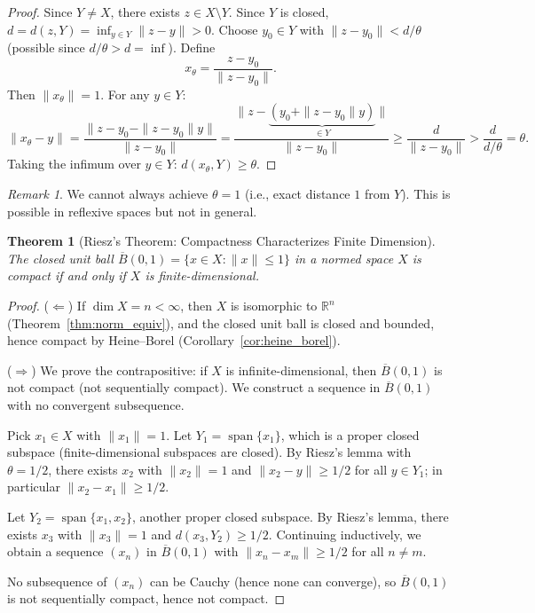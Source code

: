 \documentclass[11pt,a4paper]{article}
\theoremstyle{definition}
\theoremstyle{plain}
\newtheorem{theorem}{Theorem}[section]
\theoremstyle{remark}
\newtheorem{remark}{Remark}[section]
\newcommand{\R}{\mathbb{R}}
\DeclareMathOperator{\Span}{span}
\begin{document}
\begin{proof}
Since $Y \ne X$, there exists $z \in X \setminus Y$. Since $Y$ is closed,
$d = d(z, Y) = \inf_{y \in Y} \|z - y\| > 0$. Choose $y_0 \in Y$ with
$\|z - y_0\| < d/\theta$ (possible since $d/\theta > d = \inf$). Define
\[
x_\theta = \frac{z - y_0}{\|z - y_0\|}.
\]
Then $\|x_\theta\| = 1$. For any $y \in Y$:
\[
\|x_\theta - y\| = \frac{\|z - y_0 - \|z - y_0\| y\|}{\|z - y_0\|}
= \frac{\|z - \underbrace{(y_0 + \|z - y_0\| y)}_{\in Y}\|}{\|z - y_0\|}
\ge \frac{d}{\|z - y_0\|} > \frac{d}{d/\theta} = \theta.
\]
Taking the infimum over $y \in Y$: $d(x_\theta, Y) \ge \theta$.
\end{proof}

\begin{remark}
We cannot always achieve $\theta = 1$ (i.e., exact distance $1$ from $Y$). This is
possible in reflexive spaces but not in general.
\end{remark}

\begin{theorem}[Riesz's Theorem: Compactness Characterizes Finite Dimension]
\label{thm:riesz_compact}
The closed unit ball $\overline{B}(0,1) = \{x \in X : \|x\| \le 1\}$ in a normed
space $X$ is compact if and only if $X$ is finite-dimensional.
\end{theorem}

\begin{proof}
($\Leftarrow$) If $\dim X = n < \infty$, then $X$ is isomorphic to $\R^n$
(Theorem~\ref{thm:norm_equiv}), and the closed unit ball is closed and bounded,
hence compact by Heine--Borel (Corollary~\ref{cor:heine_borel}).

($\Rightarrow$) We prove the contrapositive: if $X$ is infinite-dimensional, then
$\overline{B}(0,1)$ is not compact (not sequentially compact). We construct a
sequence in $\overline{B}(0,1)$ with no convergent subsequence.

Pick $x_1 \in X$ with $\|x_1\| = 1$. Let $Y_1 = \Span\{x_1\}$, which is a proper
closed subspace (finite-dimensional subspaces are closed). By Riesz's lemma with
$\theta = 1/2$, there exists $x_2$ with $\|x_2\| = 1$ and $\|x_2 - y\| \ge 1/2$
for all $y \in Y_1$; in particular $\|x_2 - x_1\| \ge 1/2$.

Let $Y_2 = \Span\{x_1, x_2\}$, another proper closed subspace. By Riesz's lemma,
there exists $x_3$ with $\|x_3\| = 1$ and $d(x_3, Y_2) \ge 1/2$. Continuing
inductively, we obtain a sequence $(x_n)$ in $\overline{B}(0,1)$ with
$\|x_n - x_m\| \ge 1/2$ for all $n \ne m$.

No subsequence of $(x_n)$ can be Cauchy (hence none can converge), so
$\overline{B}(0,1)$ is not sequentially compact, hence not compact.
\end{proof}
\end{document}
